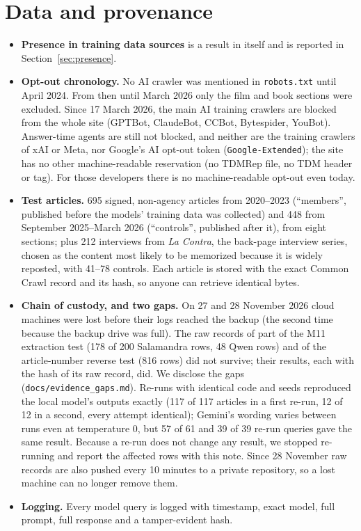 \documentclass[10pt,a4paper]{article}
\begin{document}
\section{Data and provenance}\label{sec:data}
\begin{itemize}
\item \textbf{Presence in training data sources} is a result in itself and is reported in
Section~\ref{sec:presence}.
\item \textbf{Opt-out chronology.} No AI crawler was mentioned in \texttt{robots.txt} until April 2024. From then
until March 2026 only the film and book sections were excluded. Since 17 March 2026, the main AI training crawlers are
blocked from the whole site (GPTBot, ClaudeBot, CCBot, Bytespider, YouBot). Answer-time agents are still not blocked,
and neither are the training crawlers of xAI or Meta, nor Google's AI opt-out token (\texttt{Google-Extended}); the
site has no other machine-readable reservation (no TDMRep file, no TDM header or tag). For those developers there is
no machine-readable opt-out even today.
\item \textbf{Test articles.} 695 signed, non-agency articles from 2020--2023 (``members'', published before the models'
training data was collected) and 448 from September 2025--March 2026 (``controls'', published after it), from eight
sections; plus 212 interviews from \emph{La Contra}, the back-page interview series, chosen as the content most
likely to be memorized because it is widely reposted, with 41--78 controls. Each article is stored with the exact
Common Crawl record and its hash, so anyone can retrieve identical bytes.
\item \textbf{Chain of custody, and two gaps.} On 27 and 28 November 2026 cloud machines were lost before their logs
reached the backup (the second time because the backup drive was full). The raw records of part of the M11 extraction
test (178 of 200 Salamandra rows, 48 Qwen rows) and of the article-number reverse test (816 rows) did not survive;
their results, each with the hash of its raw record, did. We disclose the gaps (\texttt{docs/evidence\_gaps.md}).
Re-runs with identical code and seeds reproduced the local model's outputs exactly (117 of 117 articles in a first
re-run, 12 of 12 in a second, every attempt identical); Gemini's wording varies between runs even at temperature 0,
but 57 of 61 and 39 of 39 re-run queries gave the same result. Because a re-run does not change any result, we stopped
re-running and report the affected rows with this note. Since 28 November raw records are also pushed every 10
minutes to a private repository, so a lost machine can no longer remove them.
\item \textbf{Logging.} Every model query is logged with timestamp, exact model, full prompt, full response
and a tamper-evident hash.
\end{itemize}
\end{document}
